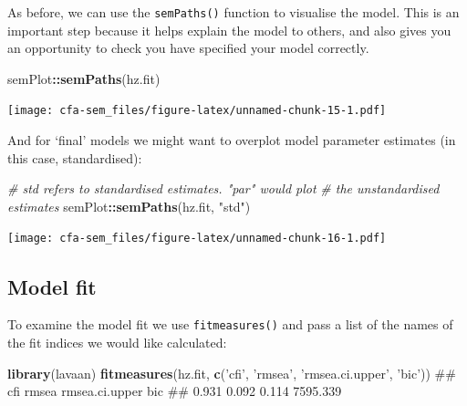 \documentclass[]{article}
\newenvironment{Shaded}{\begin{snugshade}}{\end{snugshade}}
\newcommand{\KeywordTok}[1]{\textcolor[rgb]{0.13,0.29,0.53}{\textbf{#1}}}
\newcommand{\StringTok}[1]{\textcolor[rgb]{0.31,0.60,0.02}{#1}}
\newcommand{\CommentTok}[1]{\textcolor[rgb]{0.56,0.35,0.01}{\textit{#1}}}
\newcommand{\OperatorTok}[1]{\textcolor[rgb]{0.81,0.36,0.00}{\textbf{#1}}}
\newcommand{\NormalTok}[1]{#1}
\theoremstyle{definition}
\theoremstyle{definition}
\theoremstyle{definition}
\theoremstyle{remark}
\begin{document}
As before, we can use the \texttt{semPaths()} function to visualise the
model. This is an important step because it helps explain the model to
others, and also gives you an opportunity to check you have specified
your model correctly.

\begin{Shaded}
\begin{Highlighting}[]
\NormalTok{semPlot}\OperatorTok{::}\KeywordTok{semPaths}\NormalTok{(hz.fit)}
\end{Highlighting}
\end{Shaded}

\texttt{[image: cfa-sem\_files/figure-latex/unnamed-chunk-15-1.pdf]}

And for `final' models we might want to overplot model parameter
estimates (in this case, standardised):

\begin{Shaded}
\begin{Highlighting}[]
\CommentTok{# std refers to standardised estimates. "par" would plot}
\CommentTok{# the unstandardised estimates}
\NormalTok{semPlot}\OperatorTok{::}\KeywordTok{semPaths}\NormalTok{(hz.fit, }\StringTok{"std"}\NormalTok{)}
\end{Highlighting}
\end{Shaded}

\texttt{[image: cfa-sem\_files/figure-latex/unnamed-chunk-16-1.pdf]}

\subsection*{Model fit}\label{model-fit}

To examine the model fit we use \texttt{fitmeasures()} and pass a list
of the names of the fit indices we would like calculated:

\begin{Shaded}
\begin{Highlighting}[]
\KeywordTok{library}\NormalTok{(lavaan)}
\KeywordTok{fitmeasures}\NormalTok{(hz.fit, }\KeywordTok{c}\NormalTok{(}\StringTok{'cfi'}\NormalTok{, }\StringTok{'rmsea'}\NormalTok{, }\StringTok{'rmsea.ci.upper'}\NormalTok{, }\StringTok{'bic'}\NormalTok{)) }
\NormalTok{##            cfi          rmsea rmsea.ci.upper            bic }
\NormalTok{##          0.931          0.092          0.114       7595.339}
\end{Highlighting}
\end{Shaded}
\end{document}
